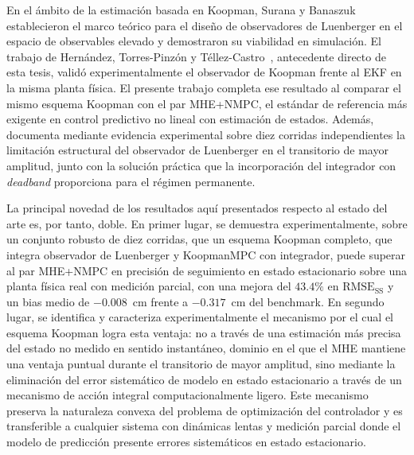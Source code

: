 \documentclass[12pt,letterpaper]{article}
\begin{document}
En el ámbito de la estimación basada en Koopman, Surana y 
Banaszuk~\cite{surana2016} establecieron el marco teórico para el 
diseño de observadores de Luenberger en el espacio de observables 
elevado y demostraron su viabilidad en simulación. El trabajo de 
Hernández, Torres-Pinzón y Téllez-Castro~\cite{hernandez2025sensors}, 
antecedente directo de esta tesis, validó experimentalmente el 
observador de Koopman frente al EKF en la misma planta física. 
El presente trabajo completa ese resultado al comparar el mismo
esquema Koopman con el par MHE+NMPC, el estándar de referencia
más exigente en control predictivo no lineal con estimación de
estados. Además, documenta mediante evidencia experimental sobre
diez corridas independientes la limitación estructural del
observador de Luenberger en el transitorio de mayor amplitud,
junto con la solución práctica que la incorporación del
integrador con \textit{deadband} proporciona para el régimen
permanente.

La principal novedad de los resultados aquí presentados respecto al 
estado del arte es, por tanto, doble. En primer lugar, se demuestra 
experimentalmente, sobre un conjunto robusto de diez corridas, que
un esquema Koopman completo, que integra observador de Luenberger y
KoopmanMPC con integrador, puede superar al par MHE+NMPC en
precisión de seguimiento en estado estacionario sobre una planta 
física real con medición parcial, con una mejora del $43.4\%$ en 
$\mathrm{RMSE}_{\mathrm{SS}}$ y un bias medio de $-0.008$~cm 
frente a $-0.317$~cm del benchmark. En segundo lugar, se 
identifica y caracteriza experimentalmente el mecanismo por el 
cual el esquema Koopman logra esta ventaja: no a través de una 
estimación más precisa del estado no medido en sentido
instantáneo, dominio en el que el MHE mantiene una ventaja
puntual durante el transitorio de mayor amplitud, sino mediante
la eliminación del error sistemático de modelo en estado
estacionario a través de un mecanismo de acción integral
computacionalmente ligero. Este mecanismo preserva la naturaleza
convexa del problema de optimización del controlador y es
transferible a cualquier sistema con dinámicas lentas y medición
parcial donde el modelo de predicción presente errores
sistemáticos en estado estacionario.
\end{document}
